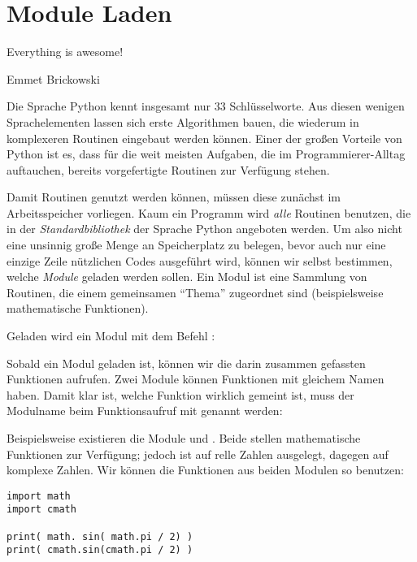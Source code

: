 \chapter{Module Laden}
\epigraph{
	Everything is awesome!
}{Emmet Brickowski}

Die Sprache Python kennt insgesamt nur 33 Schlüsselworte. Aus diesen wenigen Sprachelementen lassen sich erste Algorithmen bauen, die wiederum in komplexeren Routinen eingebaut werden können. Einer der großen Vorteile von Python ist es, dass für die weit meisten Aufgaben, die im Programmierer-Alltag auftauchen, bereits vorgefertigte Routinen zur Verfügung stehen.

Damit Routinen genutzt werden können, müssen diese zunächst im Arbeitsspeicher vorliegen. Kaum ein Programm wird \emph{alle} Routinen benutzen, die in der \emph{Standardbibliothek} der Sprache Python angeboten werden. Um also nicht eine unsinnig große Menge an Speicherplatz zu belegen, bevor auch nur eine einzige Zeile nützlichen Codes ausgeführt wird, können wir selbst bestimmen, welche \emph{Module} geladen werden sollen. Ein Modul ist eine Sammlung von Routinen, die einem gemeinsamen \enquote{Thema} zugeordnet sind (beispielsweise mathematische Funktionen).

Geladen wird ein Modul mit dem Befehl :
\begin{codebox}[Syntax]
\end{codebox}

Sobald ein Modul geladen ist, können wir die darin zusammen gefassten Funktionen aufrufen. Zwei Module können Funktionen mit gleichem Namen haben. Damit klar ist, welche Funktion wirklich gemeint ist, muss der Modulname beim Funktionsaufruf mit genannt werden:

\begin{codebox}[Syntax]
\end{codebox}

Beispielsweise existieren die Module  und . Beide stellen mathematische Funktionen zur Verfügung; jedoch ist  auf relle Zahlen ausgelegt,  dagegen auf komplexe Zahlen. Wir können die Funktionen aus beiden Modulen so benutzen:

\begin{codebox}
\begin{verbatim}
import math
import cmath

print( math. sin( math.pi / 2) )
print( cmath.sin(cmath.pi / 2) )
\end{verbatim}
\end{codebox}

